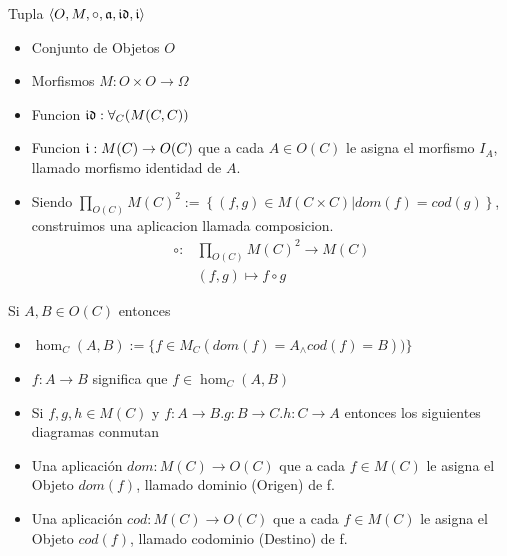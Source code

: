 \begin{defn}[Categoria]
\end{defn}
Tupla $\langle O,M,\circ,\mathfrak{a},\mathfrak{id},\mathfrak{i} \rangle$ 
\begin{itemize}
\item Conjunto de Objetos $O$
\item Morfismos $M: O \times O \to \Omega$
\item Funcion $\mathfrak{id} : \forall_C (M(C,C))$
\item Funcion $\mathfrak{i} : M(C) \to O(C)$ que a cada $A \in O(C)$ le
asigna el morfismo $I_A$, llamado morfismo identidad de $A$.
\item Siendo $\displaystyle \prod_{O(C)} M(C)^2 := \left\lbrace (f, g) \in M(C \times C) | dom(f)=cod(g) \right\rbrace$, construimos una aplicacion llamada composicion.
\begin{align*}
  \displaystyle \circ: & \prod_{O(C)} M(C)^2  \to M(C) \\
					   & (f,g) 					  \mapsto f \circ g
\end{align*}
\end{itemize}

\begin{note}
Si $A,B \in O(C)$ entonces 

\begin{itemize}
\item $\hom_{C}(A,B):= \{ f \in M_{C}(dom(f)=A _{\wedge} cod(f)=B)) \}$
\item $f: A \to B$ significa que $f \in \hom_{C}(A,B)$
\item Si $f,g,h \in M(C)$ y $f:A \to B.g:B \to C.h:C \to A$ entonces los siguientes diagramas conmutan

	
\end{itemize}
\end{note}

\begin{defn}
\end{defn}
\begin{itemize}
\item Una aplicación $dom : M(C) \to O(C)$ que a cada $f \in M(C)$ le
asigna el Objeto $dom(f)$, llamado dominio (Origen) de f.
\item Una aplicación $cod : M(C) \to O(C)$ que a cada $f \in M(C)$ le
asigna el Objeto $cod(f)$, llamado codominio (Destino) de f.
\end{itemize}

